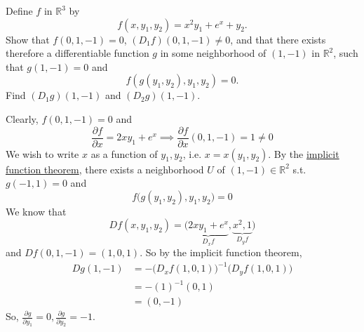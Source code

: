 	\begin{exercise}[Rudin 9.23]
		Define $f$ in $\mathbb{R}^3$ by
		\begin{equation}
			f(x,y_1,y_2)=x^2y_1+e^x+y_2.
		\end{equation}
		Show that $f(0,1,-1)=0$, $(D_1f)(0,1,-1)\neq0$, and that there exists therefore a differentiable function $g$ in some neighborhood of $(1,-1)$ in $\mathbb{R}^2$, such that $g(1,-1)=0$ and
		\begin{equation}
			f(g(y_1,y_2),y_1,y_2)=0.
		\end{equation}
		Find $(D_1g)(1,-1)$ and $(D_2g)(1,-1)$.
	\end{exercise}
	\begin{solution}
	  Clearly, $f(0, 1, -1) = 0$ and 
		\begin{equation}
			\frac{\partial f}{\partial x} = 2xy_1 + e^x \implies \frac{\partial f}{\partial x} (0, 1, -1) = 1 \neq 0
		\end{equation}
		We wish to write $x$ as a function of $y_1, y_2$, i.e. $x = x(y_1, y_2)$. By the \hyperref[thm:implicit-function-theorem]{implicit function theorem}, there exists a neighborhood $U$ of $(1, -1) \in \mathbb{R}^2$ s.t. $g(-1, 1) = 0$ and 
		\begin{equation}
		  f\big( g(y_1, y_2), y_1, y_2 \big) = 0
		\end{equation}
		We know that 
		\begin{equation}
			Df(x, y_1, y_2) = \big( \underbrace{2xy_1 + e^x}_{D_x f}, \underbrace{x^2, 1}_{D_y f} \big)
		\end{equation}
		and $Df(0, 1, -1) = (1, 0, 1)$. So by the implicit function theorem,
		\begin{align}
			Dg(1, -1) & = - \big( D_x f(1, 0, 1) \big)^{-1} \big(D_y f(1, 0, 1)\big) \\  
								& = - (1)^{-1} (0, 1) \\
								& = (0, -1)
		\end{align} 
		So, $\frac{\partial g}{\partial y_1} = 0, \frac{\partial g}{\partial y_2} = -1$. 
	\end{solution}

